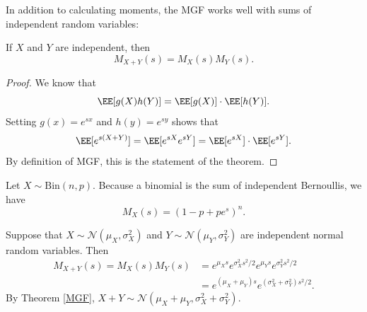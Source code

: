 \documentclass{ximera}
\begin{document}
In addition to calculating moments, the MGF works well with sums of independent random variables:
\begin{theorem}
If $X$ and $Y$ are independent, then
$$
M_{X+Y}(s) = M_X(s) M_Y(s).
$$
\end{theorem}
\begin{proof}
We know that
$$
\EE[g(X)h(Y)] = \EE[g(X)] \cdot \EE[h(Y)].
$$
Setting $g(x) = e^{sx}$ and $h(y)=e^{sy}$ shows that
$$
\EE[e^{s(X+Y)}] = \EE[e^{sX}e^{sY}] = \EE[e^{sX}] \cdot \EE[e^{sY}].
$$
By definition of MGF, this is the statement of the theorem.
\end{proof}

\begin{example}\label{Bin}
Let $X\sim \textrm{Bin}(n,p)$. Because a binomial is the sum of independent Bernoullis, we have
$$
M_X(s) = (1-p+pe^s)^n.
$$
\end{example}

\begin{example}
Suppose that $X\sim \mathcal{N}(\mu_X,\sigma_X^2)$ and $Y\sim \mathcal{N}(\mu_Y,\sigma_Y^2)$ are independent normal random variables. Then
\begin{align*}
M_{X+Y}(s) = M_X(s)M_Y(s) &= e^{\mu_X s} e^{\sigma_X^2 s^2/2}e^{\mu_Y s} e^{\sigma_Y^2 s^2/2}\\
&= e^{(\mu_X+\mu_Y) s} e^{(\sigma_X^2 + \sigma_Y^2)s^2/2}.
\end{align*}
By Theorem \ref{MGF}, $X+Y \sim \mathcal{N}(\mu_X + \mu_Y, \sigma_X^2 + \sigma_Y^2)$.
\end{example}
\end{document}
